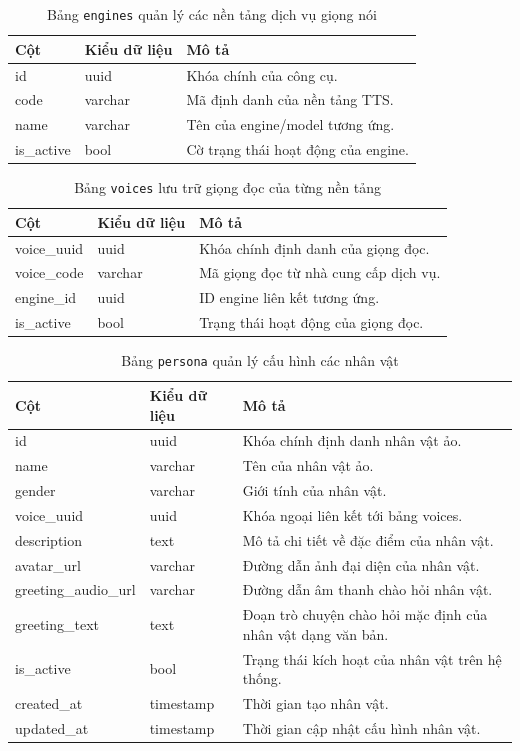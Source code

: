 \begin{table}[H]
\centering
\begin{tabular}{|l|l|p{6cm}|}
\hline
\textbf{Cột} & \textbf{Kiểu dữ liệu} & \textbf{Mô tả} \\ \hline
id & uuid & Khóa chính của công cụ. \\ \hline
code & varchar & Mã định danh của nền tảng TTS. \\ \hline
name & varchar & Tên của engine/model tương ứng. \\ \hline
is\_active & bool & Cờ trạng thái hoạt động của engine. \\ \hline
\end{tabular}
\caption{Bảng \texttt{engines} quản lý các nền tảng dịch vụ giọng nói}
\end{table}

\begin{table}[H]
\centering
\begin{tabular}{|l|l|p{6cm}|}
\hline
\textbf{Cột} & \textbf{Kiểu dữ liệu} & \textbf{Mô tả} \\ \hline
voice\_uuid & uuid & Khóa chính định danh của giọng đọc. \\ \hline
voice\_code & varchar & Mã giọng đọc từ nhà cung cấp dịch vụ. \\ \hline
engine\_id & uuid & ID engine liên kết tương ứng. \\ \hline
is\_active & bool & Trạng thái hoạt động của giọng đọc. \\ \hline
\end{tabular}
\caption{Bảng \texttt{voices} lưu trữ giọng đọc của từng nền tảng}
\end{table}

\begin{table}[H]
\centering
\begin{tabular}{|l|l|p{6cm}|}
\hline
\textbf{Cột} & \textbf{Kiểu dữ liệu} & \textbf{Mô tả} \\ \hline
id & uuid & Khóa chính định danh nhân vật ảo. \\ \hline
name & varchar & Tên của nhân vật ảo. \\ \hline
gender & varchar & Giới tính của nhân vật. \\ \hline
voice\_uuid & uuid & Khóa ngoại liên kết tới bảng voices. \\ \hline
description & text & Mô tả chi tiết về đặc điểm của nhân vật. \\ \hline
avatar\_url & varchar & Đường dẫn ảnh đại diện của nhân vật. \\ \hline
greeting\_audio\_url & varchar & Đường dẫn âm thanh chào hỏi nhân vật. \\ \hline
greeting\_text & text & Đoạn trò chuyện chào hỏi mặc định của nhân vật dạng văn bản. \\ \hline
is\_active & bool & Trạng thái kích hoạt của nhân vật trên hệ thống. \\ \hline
created\_at & timestamp & Thời gian tạo nhân vật. \\ \hline
updated\_at & timestamp & Thời gian cập nhật cấu hình nhân vật. \\ \hline
\end{tabular}
\caption{Bảng \texttt{persona} quản lý cấu hình các nhân vật}
\end{table}
